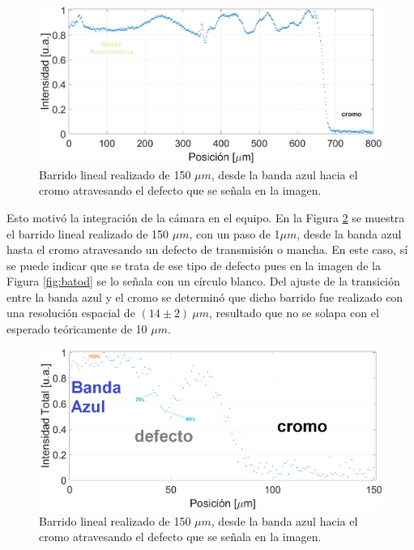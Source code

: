  \begin{figure}[H]
	\centering
	\includegraphics[width=1.0\textwidth]{Figs/microespectrometro/defectosmuchossinvis.png}
	\caption{Barrido lineal realizado de 150 $\mu m$, desde la banda azul hacia el cromo atravesando el defecto que se señala en la imagen.}
	\label{fig:muchossi}
\end{figure}


Esto motivó la integración de la cámara en el equipo. En la Figura \ref{fig:barinted} se muestra el barrido lineal realizado de 150 $\mu m$, con un paso de 1$\mu m$, desde la banda azul hasta el cromo atravesando un defecto de transmisión o mancha. En este caso, sí se puede indicar que se trata de ese tipo de defecto pues en la imagen de la Figura \ref{fig:batod} se lo señala con un círculo blanco. Del ajuste de la transición entre la banda azul y el cromo se determinó que dicho barrido fue realizado con una resolución espacial de $(14 \pm 2)~\mu m$, resultado que no se solapa con el esperado teóricamente de 10 $\mu m$.

 \begin{figure}[H]
	\centering
	\includegraphics[width=1.0\textwidth]{Figs/microespectrometro/inten_totaldefecto.png}
	\caption{Barrido lineal realizado de 150 $\mu m$, desde la banda azul hacia el cromo atravesando el defecto que se señala en la imagen.}
	\label{fig:barinted}
\end{figure}

